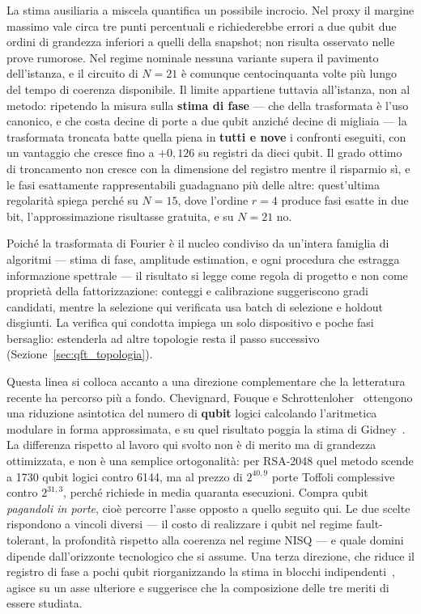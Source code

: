 \begin{onehalfspace}
La stima ausiliaria a miscela quantifica un possibile incrocio. Nel proxy
il margine massimo vale circa tre punti percentuali e richiederebbe errori
a due qubit due ordini di grandezza inferiori a quelli della snapshot;
non risulta osservato nelle prove rumorose. Nel regime nominale
nessuna variante supera il pavimento dell'istanza, e il circuito di $N=21$ è
comunque centocinquanta volte più lungo del tempo di coerenza disponibile. Il limite
appartiene tuttavia all'istanza, non al metodo: ripetendo la misura sulla \textbf{stima
di fase} --- che della trasformata è l'uso canonico, e che costa decine di porte a due
qubit anziché decine di migliaia --- la trasformata troncata batte quella piena in
\textbf{tutti e nove} i confronti eseguiti, con un vantaggio che cresce fino a $+0{,}126$
su registri da dieci qubit. Il grado ottimo di troncamento non cresce con la dimensione del
registro mentre il risparmio sì, e le fasi esattamente rappresentabili guadagnano più delle
altre: quest'ultima regolarità spiega perché su $N=15$, dove l'ordine $r=4$ produce fasi
esatte in due bit, l'approssimazione risultasse gratuita, e su $N=21$ no.

Poiché la trasformata di Fourier è il nucleo condiviso da un'intera famiglia di algoritmi ---
stima di fase, amplitude estimation, e ogni procedura che estragga informazione spettrale
--- il risultato si legge come regola di progetto e non come proprietà della
fattorizzazione: conteggi e calibrazione suggeriscono gradi candidati,
mentre la selezione qui verificata usa batch di selezione e holdout
disgiunti. La verifica qui condotta impiega un solo
dispositivo e poche fasi bersaglio: estenderla ad altre topologie resta il passo successivo
(Sezione~\ref{sec:qft_topologia}).

Questa linea si colloca accanto a una direzione complementare che la letteratura recente
ha percorso più a fondo. Chevignard, Fouque e Schrottenloher~\cite{chevignard2025}
ottengono una riduzione asintotica del numero di \textbf{qubit} logici calcolando
l'aritmetica modulare in forma approssimata, e su quel risultato poggia la stima di
Gidney~\cite{gidney2025}. La differenza rispetto al lavoro qui svolto non è di merito ma
di grandezza ottimizzata, e non è una semplice ortogonalità: per RSA-2048 quel metodo
scende a 1730 qubit logici contro 6144, ma al prezzo di $2^{40{,}9}$ porte Toffoli
complessive contro $2^{31{,}3}$, perché richiede in media quaranta esecuzioni. Compra
qubit \emph{pagandoli in porte}, cioè percorre l'asse opposto a quello seguito qui.
Le due scelte rispondono a vincoli diversi --- il costo di realizzare i qubit nel regime
fault-tolerant, la profondità rispetto alla coerenza nel regime \ac{NISQ} --- e quale
domini dipende dall'orizzonte tecnologico che si assume. Una terza direzione, che riduce il registro di fase a
pochi qubit riorganizzando la stima in blocchi indipendenti~\cite{shukla2026}, agisce
su un asse ulteriore e suggerisce che la composizione delle tre meriti di essere studiata.


\end{onehalfspace}
